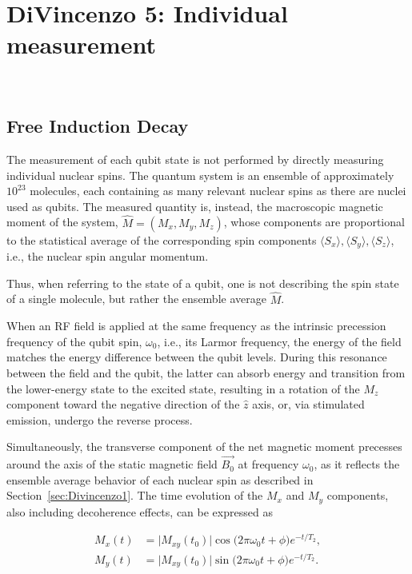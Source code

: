 \section{DiVincenzo 5: Individual measurement} 
~\label{sec:Divincenzo5}

\subsection{Free Induction Decay}
\label{subsec:FID}

The measurement of each qubit state is not performed by directly measuring individual nuclear spins. The quantum system is an ensemble of approximately \(10^{23}\) molecules, each containing as many relevant nuclear spins as there are nuclei used as qubits. The measured quantity is, instead, the macroscopic magnetic moment of the system, \(\hat{M}=(M_x,M_y,M_z)\), whose components are proportional to the statistical average of the corresponding spin components \(\langle S_x\rangle,\langle S_y\rangle,\langle S_z\rangle\), i.e., the nuclear spin angular momentum.

Thus, when referring to the state of a qubit, one is not describing the spin state of a single molecule, but rather the ensemble average \(\hat{M}\).

When an RF field is applied at the same frequency as the intrinsic precession frequency of the qubit spin, \(\omega_0\), i.e., its Larmor frequency, the energy of the field matches the energy difference between the qubit levels. During this resonance between the field and the qubit, the latter can absorb energy and transition from the lower-energy state to the excited state, resulting in a rotation of the \(M_z\) component toward the negative direction of the \(\hat{z}\) axis, or, via stimulated emission, undergo the reverse process.

Simultaneously, the transverse component of the net magnetic moment precesses around the axis of the static magnetic field \(\vec{B_0}\) at frequency \(\omega_0\), as it reflects the ensemble average behavior of each nuclear spin as described in Section~\ref{sec:Divincenzo1}. The time evolution of the \(M_x\) and \(M_y\) components, also including decoherence effects, can be expressed as

\begin{equation}
\begin{aligned}
M_x(t) &= \lvert M_{xy}(t_0)\rvert \cos\! \bigl(2\pi\omega_0 t+\phi\bigr)e^{-t/T_2}, \\
M_y(t) &= \lvert M_{xy}(t_0)\rvert \sin\!\bigl(2\pi\omega_0 t+\phi\bigr)e^{-t/T_2}.
\label{eq:net_magnetic_moment}
\end{aligned}
\end{equation}

